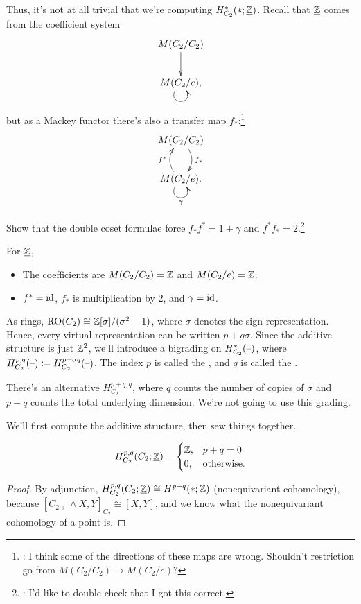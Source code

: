 Thus, it's not at all trivial that we're computing $H_{C_2}^*(*;\underline{\mathbb Z})$. Recall that $\underline{\mathbb Z}$ comes
from the coefficient system
\[\xymatrix{
	M(C_2/C_2)\ar[d]\\
	M(C_2/e),\ar@(dl,dr)_{}
}\]
but as a Mackey functor there's also a transfer map $f_*$:\footnote{\TODO: I think some of the directions of these
maps are wrong. Shouldn't restriction go from $M(C_2/C_2)\to M(C_2/e)$?}
\[\xymatrix{
	M(C_2/C_2)\ar@/^0.4cm/[d]^{f_*}\\
	M(C_2/e).\ar@/^0.4cm/[u]^{f^*}\ar@(dl,dr)_\gamma
}\]
\begin{ex}
Show that the double coset formulae force $f_*f^* = 1+\gamma$ and $f^*f_* = 2$.\footnote{\TODO: I'd like to
double-check that I got this correct.}
\end{ex}
For $\underline{\mathbb Z}$,
\begin{itemize}
	\item The coefficients are $M(C_2/C_2) = \mathbb Z$ and $M(C_2/e) = \mathbb Z$.
	\item $f^* = \mathrm{id}$, $f_*$ is multiplication by $2$, and $\gamma = \mathrm{id}$.
\end{itemize}
As rings, $\mathrm{RO}(C_2)\cong\mathbb Z[\sigma]/(\sigma^2-1)$, where $\sigma$ denotes the sign representation. Hence, every virtual representation can be written $p+q\sigma$. Since
the additive structure is just $\mathbb Z^2$, we'll introduce a bigrading on $H^*_{C_2}(\text{--})$, where $H_{C_2}^{p,q}(\text{--})
\coloneqq H_{C_2}^{p+\sigma q}(\text{--})$. The index $p$ is called the
, and $q$ is called the
.
\begin{rem}
There's an alternative  $H_{C_2}^{p+q,q}$, where $q$ counts
the number of copies of $\sigma$ and $p+q$ counts the total underlying dimension. We're not going to use this
grading.
\end{rem}
We'll first compute the additive structure, then sew things together.
\begin{lem}
\[H_{C_2}^{p,q}(C_2; \underline{\mathbb Z}) = \begin{cases}
	\mathbb Z, &p+q=0\\
	0, &\text{\rm otherwise.}
\end{cases}\]
\end{lem}
\begin{proof}
By adjunction, $H_{C_2}^{p,q}(C_2;\underline{\mathbb Z})\cong H^{p+q}(*;\mathbb Z)$ (nonequivariant cohomology), because
$[C_{2+}\wedge X, Y]_{C_2}\cong [X,Y]$, and we know what the nonequivariant cohomology of a point is.
\end{proof}
